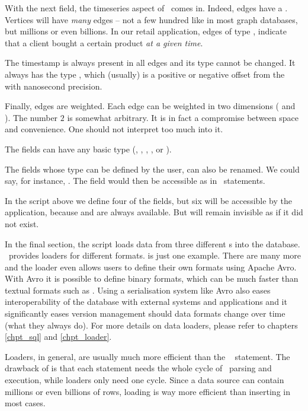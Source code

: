 With the next field, the timeseries aspect of \nowdb\
comes in. Indeed, edges have a .
Vertices will have \emph{many} edges -- not a few hundred
like in most graph databases, but millions or even
billions. In our retail application,
edges of type , indicate that a client
bought a certain product \emph{at a given time}.

The timestamp is always present in all edges and
its type cannot be changed.
It always has the type ,
which (usually) is a positive or negative
offset from the  
with nanosecond precision.

Finally, edges are weighted. Each edge can be weighted
in two dimensions ( and ).
The number $2$ is somewhat arbitrary.
It is in fact a compromise between space and convenience.
One should not interpret too much into it.

The  fields can have any basic type
(, , , ,
 or ).

The fields whose type can be defined by the user,
can also be renamed. We could say, for instance,
.
The field  would then be accessible as
 in \sql\ statements. 

In the script above we define four of the fields,
but six will be accessible by the application,
because  and  are always available.
But  will remain invisible as if it did not exist.

In the final section,
the script loads data from three different s
into the database. \nowdb\ provides loaders
for different formats. \acronym{csv} is just one example.
There are many more and the loader even allows 
users to define
their own formats using Apache Avro.
With Avro it is possible to define binary formats, which
can be much faster than textual formats such as .
Using a serialisation system like Avro also eases
interoperability of the database with
external systems and applications and it
significantly eases version management should data formats
change over time (what they always do). 
For more details on data loaders, please refer to chapters
\ref{chpt_sql} and \ref{chpt_loader}.

Loaders, in general, are usually much more efficient than
the \sql\  statement.
The drawback of \term{insert} is that each statement
needs the whole cycle of \sql\ parsing and execution,
while loaders only need one cycle. Since a data source
can contain millions or even billions of rows,
loading is way more efficient than inserting in most cases.

